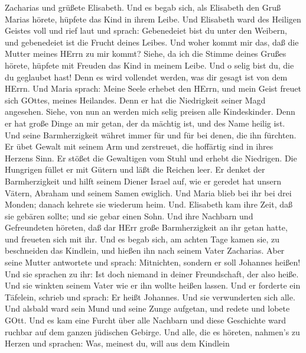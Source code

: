 Zacharias und grüßete Elisabeth.  Und es begab sich, als
Elisabeth den Gruß Marias hörete, hüpfete das Kind in ihrem Leibe. Und
Elisabeth ward des Heiligen Geistes voll  und rief laut und
sprach: Gebenedeiet bist du unter den Weibern, und gebenedeiet ist die
Frucht deines Leibes.  Und woher kommt mir das, daß die
Mutter meines HErrn zu mir kommt?  Siehe, da ich die Stimme
deines Grußes hörete, hüpfete mit Freuden das Kind in meinem Leibe.
 Und o selig bist du, die du geglaubet hast! Denn es wird
vollendet werden, was dir gesagt ist von dem HErrn.  Und
Maria sprach: Meine Seele erhebet den HErrn,  und mein
Geist freuet sich GOttes, meines Heilandes.  Denn er hat
die Niedrigkeit seiner Magd angesehen. Siehe, von nun an werden mich
selig preisen alle Kindeskinder.  Denn er hat große Dinge
an mir getan, der da mächtig ist, und des Name heilig ist. 
Und seine Barmherzigkeit währet immer für und für bei denen, die ihn
fürchten.  Er übet Gewalt mit seinem Arm und zerstreuet,
die hoffärtig sind in ihres Herzens Sinn.  Er stößet die
Gewaltigen vom Stuhl und erhebt die Niedrigen.  Die
Hungrigen füllet er mit Gütern und läßt die Reichen leer. 
Er denket der Barmherzigkeit und hilft seinem Diener Israel auf,
 wie er geredet hat unsern Vätern, Abraham und seinem Samen
ewiglich.  Und Maria blieb bei ihr bei drei Monden; danach
kehrete sie wiederum heim.  Und. Elisabeth kam ihre Zeit,
daß sie gebären sollte; und sie gebar einen Sohn.  Und ihre
Nachbarn und Gefreundeten höreten, daß dar HErr große Barmherzigkeit an
ihr getan hatte, und freueten sich mit ihr.  Und es begab
sich, am achten Tage kamen sie, zu beschneiden das Kindlein, und hießen
ihn nach seinem Vater Zacharias.  Aber seine Mutter
antwortete und sprach: Mitnichten, sondern er soll Johannes heißen!
 Und sie sprachen zu ihr: Ist doch niemand in deiner
Freundschaft, der also heiße.  Und sie winkten seinem Vater
wie er ihn wollte heißen lassen.  Und er forderte ein
Täfelein, schrieb und sprach: Er heißt Johannes. Und sie verwunderten
sich alle.  Und alsbald ward sein Mund und seine Zunge
aufgetan, und redete und lobete GOtt.  Und es kam eine
Furcht über alle Nachbarn und diese Geschichte ward ruchbar auf dem
ganzen jüdischen Gebirge.  Und alle, die es höreten,
nahmen's zu Herzen und sprachen: Was, meinest du, will aus dem Kindlein
